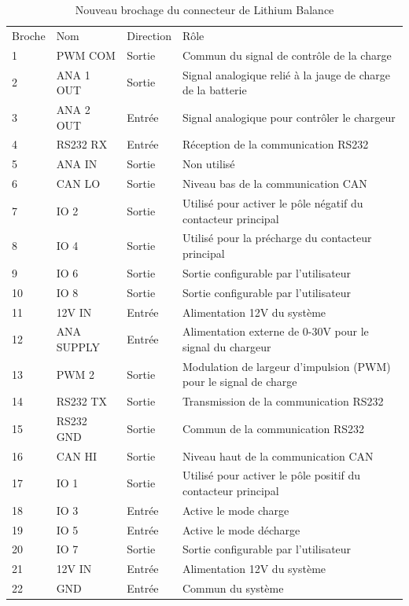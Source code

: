 	\begin{table}[H]
		\centering
		\caption{Nouveau brochage du connecteur de Lithium Balance}
		\label{22CLithiumBalance}	
		\begin{tabular}{ | l | l | l | l | }
			\hline
			Broche & Nom & Direction & Rôle \\ \hhline{|=|=|=|=|}
			1 & PWM COM & Sortie & Commun du signal de contrôle de la charge \\ \hline
			2 & ANA 1 OUT & Sortie & Signal analogique relié à la jauge de charge de la batterie \\ \hline
			3 & ANA 2 OUT & Entrée & Signal analogique pour contrôler le chargeur \\ \hline
			4 & RS232 RX & Entrée & Réception de la communication RS232 \\ \hline
			5 & ANA IN & Sortie & Non utilisé \\ \hline
			6 & CAN LO & Sortie & Niveau bas de la communication CAN \\ \hline
			7 & IO 2 & Sortie & Utilisé pour activer le pôle négatif du contacteur principal \\ \hline
			8 & IO 4 & Sortie & Utilisé pour la précharge du contacteur principal \\ \hline
			9 & IO 6 & Sortie & Sortie configurable par l'utilisateur \\ \hline
			10 & IO 8 & Sortie & Sortie configurable par l'utilisateur \\ \hline
			11 & 12V IN & Entrée & Alimentation 12V du système \\ \hline
			12 & ANA SUPPLY & Entrée & Alimentation externe de 0-30V pour le signal du chargeur \\ \hline
			13 & PWM 2 & Sortie & Modulation de largeur d'impulsion (PWM) pour le signal de charge \\ \hline
			14 & RS232 TX & Sortie & Transmission de la communication RS232 \\ \hline
			15 & RS232 GND & Sortie & Commun de la communication RS232 \\ \hline
			16 & CAN HI & Sortie & Niveau haut de la communication CAN \\ \hline
			17 & IO 1  & Sortie & Utilisé pour activer le pôle positif du contacteur principal \\ \hline
			18 & IO 3 & Entrée & Active le mode charge \\ \hline
			19 & IO 5 & Entrée & Active le mode décharge \\ \hline
			20 & IO 7 & Sortie & Sortie configurable par l'utilisateur \\ \hline
			21 & 12V IN & Entrée & Alimentation 12V du système \\ \hline
			22 & GND & Entrée & Commun du système \\ \hline
		\end{tabular}			
	\end{table}

